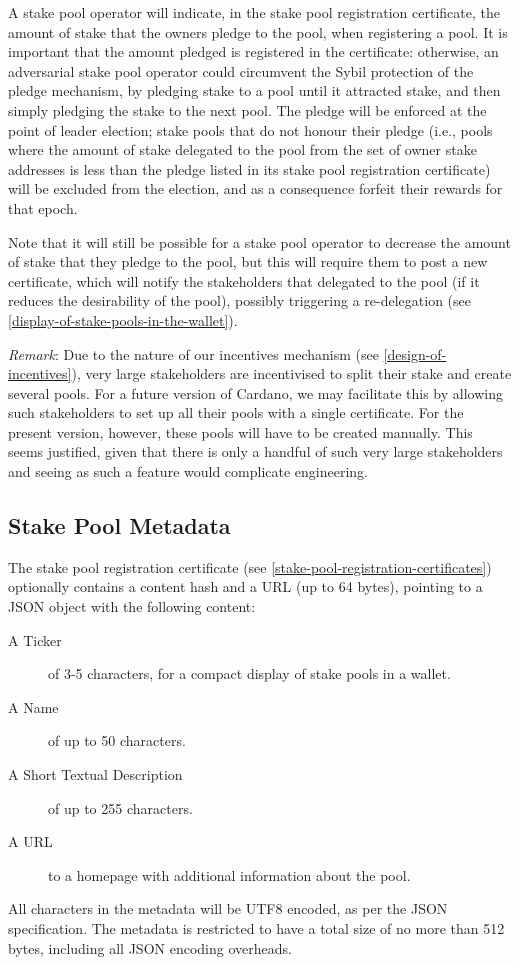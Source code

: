 \documentclass[11pt,a4paper,dvipsnames,twosided]{article}
\begin{document}
A stake pool operator will indicate, in the stake pool registration
certificate, the amount of stake that the owners pledge to
the pool, when registering a pool. It is important that the amount
pledged is registered in the certificate: otherwise,
an adversarial stake pool operator could circumvent the Sybil protection
of the pledge mechanism, by pledging stake to a pool until it attracted stake,
and then simply pledging the stake to the next pool. The pledge will be
enforced at the point of leader election; stake pools that do not
honour their pledge (i.e., pools where the amount of stake delegated
to the pool from the set of owner stake addresses is less than the pledge listed
in its stake pool registration certificate) will be excluded from the election,
and as a consequence forfeit their rewards for that epoch.

Note that it will still be possible for a stake pool operator to decrease the
amount of stake that they pledge to the pool, but this will require them to post
a new certificate, which will notify the stakeholders that delegated to the pool
(if it reduces the desirability of the pool), possibly triggering a
re-delegation (see \cref{display-of-stake-pools-in-the-wallet}).

\emph{Remark}: Due to the nature of our incentives mechanism (see
\cref{design-of-incentives}), very large stakeholders are
incentivised to split their stake and create several pools. For a future
version of Cardano, we may facilitate this by allowing such
stakeholders to set up all their pools with a single certificate. For
the present version, however, these pools will have to be created
manually. This seems justified, given that there is only a handful of
such very large stakeholders and seeing as such a feature would
complicate engineering.

\subsection{Stake Pool Metadata}
\label{stake-pool-metadata}

The stake pool registration certificate
(see \cref{stake-pool-registration-certificates}) optionally contains a content
hash and a URL (up to 64 bytes), pointing to a JSON object with the following
content:

\begin{description}
\item[A Ticker]
  of 3-5 characters, for a compact display of stake pools in a
  wallet.
\item[A Name]
  of up to 50 characters.
\item[A Short Textual Description]
  of up to 255 characters.
\item[A URL]
  to a homepage with additional information about the pool.
\end{description}
All characters in the metadata will be UTF8 encoded, as per the JSON
specification. The metadata is restricted to have a total size of no more than
512 bytes, including all JSON encoding overheads.
\end{document}
